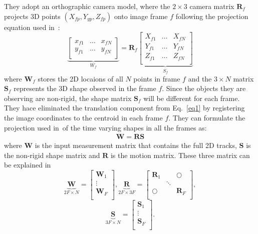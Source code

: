 \documentclass[10pt,twocolumn,letterpaper]{article}
\begin{document}
They adopt an orthographic camera model, where the $2\times3$ camera matrix $\mathbf{R}_f$ projects 3D points $(X_{fp},Y_{yp},Z_{fp})$ onto image frame $f$ following the projection equation used in~\cite{dense}:\\
\[
  \underbrace{
  \begin{bmatrix}
  x_{f1} & \ldots & x_{fN} \\
  y_{f1} & \ldots & y_{fN} \\
  \end{bmatrix}
  }_{W_f} = 
  \mathbf{R}_f
  \underbrace{
  \begin{bmatrix}
  X_{f1} & \ldots & X_{fN} \\
  Y_{f1} & \ldots & Y_{fN} \\
  Z_{f1} & \ldots & Z_{fN} \\
  \end{bmatrix}
  }_{S_f}
  \label{eq1}
  \tag{1}
\]
where $\mathbf{W}_f$ stores the 2D locaions of all $N$ points in frame $f$ and the $3\times N$ matrix $\mathbf{S}_f$ represents the 3D shape observed in the frame $f$. Since the objects they are observing are non-rigid, the shape matrix $\mathbf{S}_f$ will be different for each frame. They hace eliminated the translation component from Eq.~\ref{eq1} by registering the image coordinates to the centroid in each frame $f$. They can formulate the projection used in~\cite{dense}of the time varying shapes in all the frames as:\\
\begin{gather*}
\mathbf{W} = \mathbf{RS}
\tag{2}
\end{gather*}
where $\mathbf{W}$ is the input measurement matrix that contains the full 2D tracks, $\mathbf{S}$ is the non-rigid shape matrix and $\mathbf{R}$ is the motion matrix. These three matrix can be explained in~\cite{dense}\\
\[
  \underbrace{\mathbf{W}}_{2F\times N} = 
  \begin{bmatrix}
  \mathbf{W}_1 \\
  \vdots \\
  \mathbf{W}_F \\
  \end{bmatrix},
  \underbrace{\mathbf{R}}_{2F\times3F} = 
  \begin{bmatrix}
  \mathbf{R}_1 & & \bigcirc \\
   & \ddots & \\
  \bigcirc & & \mathbf{R}_F \\
  \end{bmatrix},
\]
\[
  \underbrace{\mathbf{S}}_{3F\times N} = 
  \begin{bmatrix}
  \mathbf{S}_1 \\
  \vdots \\
  \mathbf{S}_F \\
  \end{bmatrix}.
  \tag{3}
\]

{\small


}
\end{document}
